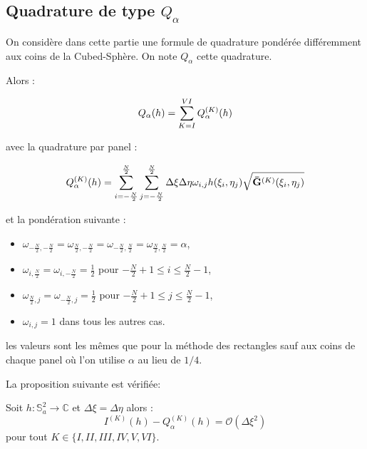 \subsection{Quadrature de type \texorpdfstring{$Q_{\alpha}$}{a}}

On considère dans cette partie une formule de quadrature pondérée différemment aux coins de la Cubed-Sphère. On note $Q_{\alpha}$ cette quadrature.

Alors :

\begin{equation}
Q_{\alpha}(h)= \displaystyle\sum\limits_{K=I}^{VI} Q^{(K)}_{\alpha}(h)
\end{equation}

avec la quadrature par panel :

\begin{equation}
Q_{\alpha}^{(K)}(h)=\displaystyle\sum\limits_{i = -\frac{N}{2}}^{\frac{N}{2}}\displaystyle\sum\limits_{j = -\frac{N}{2}}^{\frac{N}{2}} \Delta \xi \Delta \eta \omega_{i,j} h(\xi_i, \eta_j) \sqrt{\mathbf{\bar{G}}^{(K)}(\xi_i, \eta_j)}
\label{eq:alpha par panel}
\end{equation}

et la pondération suivante :

\begin{itemize}
\item $\omega_{-\frac{N}{2},-\frac{N}{2}}=\omega_{\frac{N}{2},-\frac{N}{2}}=\omega_{-\frac{N}{2},\frac{N}{2}}=\omega_{\frac{N}{2},\frac{N}{2}}=\alpha$,
\item $\omega_{i,\frac{N}{2}}=\omega_{i,-\frac{N}{2}}=\frac{1}{2}$ pour $-\frac{N}{2}+1 \leq i \leq \frac{N}{2}-1$,
\item $\omega_{\frac{N}{2},j}=\omega_{-\frac{N}{2},j}=\frac{1}{2}$ pour $-\frac{N}{2}+1 \leq j \leq \frac{N}{2}-1$,
\item $\omega_{i,j}=1$ dans tous les autres cas.
\end{itemize}

les valeurs sont les mêmes que pour la méthode des rectangles sauf aux coins de chaque panel où l'on utilise $\alpha$ au lieu de $1/4$.

La proposition suivante est vérifiée:

\begin{proposition}
Soit $h: \mathbb{S}_a^2 \rightarrow \mathbb{C}$ et $\Delta \xi = \Delta \eta$ alors :
\begin{equation}
I^{(K)}(h) - Q^{(K)}_{\alpha}(h) = \mathcal{O} \left( \Delta \xi^2 \right)
\end{equation}
pour tout $K \in \lbrace I, II, III, IV, V, VI \rbrace$.
\label{prop:consistance alpha panel}
\end{proposition}

